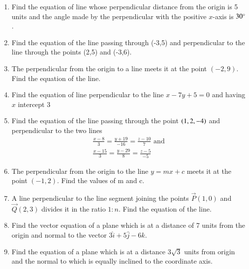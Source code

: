 \begin{enumerate}[label=\thesubsection.\arabic*,ref=\thesubsection.\theenumi]
\solution
		
\item Find the equation of line whose perpendicular distance from the origin is 5 units and the angle made by the perpendicular with the positive $x$-axis is $30\degree$.
\label{chapters/11/10/2/8}
\\
\solution

\item 
	Find the equation of the line passing through  (-3,5) and perpendicular to the line through the points (2,5) and (-3,6).
	\\
	\solution 
\label{chapters/11/10/2/10}

\item 
	The perpendicular from the origin to a line meets it at the point $(-2,9)$. Find the equation of the line.
\label{chapters/11/10/2/15}
	\\
	\solution

\item Find the equation of line perpendicular to the line $x-7y+5=0$ and having $x$ intercept $3$\\
\label{chapters/11/10/3/8}
\solution

	\item Find the equation of the line passing through the point $\left(1,2,-4\right)$ and perpendicular to the two lines
\begin{align}
	\frac{x-8}{3}=\frac{y+19}{-16}=\frac{z-10}{7} \text{ and }\\ \frac{x-15}{3}=\frac{y-29}{8}=\frac{z-5}{-5} 
\end{align}
    \solution
		
 \item The perpendicular from the origin to the line $y=mx+c$ meets it at the point $(-1,2)$. Find the values of m and c.
 \label{11.10.3.15}
	 \\
 \solution
 
\item 
A line perpendicular to the line segment joining the points $\vec{P}(1,0)$ and $\vec{Q}(2,3)$ divides it in the ratio $1:n$. Find the equation of the line.
	\\
	\solution 
\label{chapters/11/10/2/11}

\item Find the vector equation of a plane which is at a distance of 7 units from the origin and normal to the vector $3\hat{i}+5\hat{j}-6\hat{k}$.
	\\
    \solution
		
\item Find the equation of a plane which is at a distance 3$\sqrt{3}$ units from origin and the normal to which is equally inclined to the coordinate axis.

\end{enumerate}
